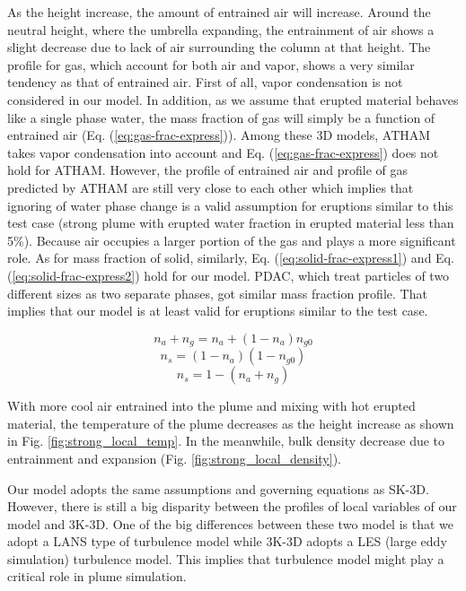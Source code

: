 \documentclass[journal abbreviation, manuscript]{copernicus}
\begin{document}
As the height increase, the amount of entrained air will increase. Around the neutral height, where the umbrella expanding, the entrainment of air shows a slight decrease due to lack of air surrounding the column at that height. The profile for gas, which account for both air and vapor, shows a very similar tendency as that of entrained air. First of all, vapor condensation is not considered in our model. In addition, as we assume that erupted material behaves like a single phase water, the mass fraction of gas will simply be a function of entrained air (Eq. (\ref{eq:gas-frac-express})). Among these 3D models, ATHAM takes vapor condensation into account and Eq. (\ref{eq:gas-frac-express}) does not hold for ATHAM. However, the profile of entrained air and profile of gas predicted by ATHAM are still very close to each other which implies that ignoring of water phase change is a valid assumption for eruptions similar to this test case (strong plume with erupted water fraction in erupted material less than 5\%). Because air occupies a larger portion of the gas and plays a more significant role. As for mass fraction of solid, similarly, Eq. (\ref{eq:solid-frac-express1}) and Eq. (\ref{eq:solid-frac-express2}) hold for our model. PDAC, which treat particles of two different sizes as two separate phases, got similar mass fraction profile. That implies that our model is at least valid for eruptions similar to the test case.
 
\begin{equation}
n_a + n_g = n_a + (1-n_a) n_{g0}
\label{eq:gas-frac-express}
\end{equation}
\begin{equation}
n_s = (1 - n_a) (1- n_{g0})
\label{eq:solid-frac-express1}
\end{equation}
\begin{equation}
n_s = 1 - (n_a + n_g)
\label{eq:solid-frac-express2}
\end{equation}

With more cool air entrained into the plume and mixing with hot erupted material, the temperature of the plume decreases as the height increase as shown in Fig. \ref{fig:strong_local_temp}. In the meanwhile, bulk density decrease due to entrainment and expansion (Fig. \ref{fig:strong_local_density}).

Our model adopts the same assumptions and governing equations as SK-3D. However, there is still a big disparity between the profiles of local variables of our model and 3K-3D. One of the big differences between these two model is that we adopt a LANS type of turbulence model while 3K-3D adopts a LES (large eddy simulation) turbulence model. This implies that turbulence model might play a critical role in plume simulation. 
\end{document}
